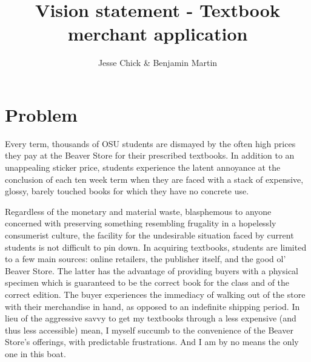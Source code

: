 \documentclass[12pt]{article}
\title{Vision statement - Textbook merchant application}
\author{Jesse Chick \& Benjamin Martin}
\begin{document}
\maketitle
\tableofcontents



\section{Problem}
\par Every term, thousands of OSU students are dismayed by the often high prices they pay at the Beaver Store for their prescribed textbooks. In addition to an unappealing sticker price, students experience the latent annoyance at the conclusion of each ten week term when they are faced with a stack of expensive, glossy, barely touched books for which they have no concrete use. 
\par Regardless of the monetary and material waste, blasphemous to anyone concerned with preserving something resembling frugality in a hopelessly consumerist culture, the facility for the undesirable situation faced by current students is not difficult to pin down. In acquiring textbooks, students are limited to a few main sources: online retailers, the publisher itself, and the good ol’ Beaver Store. The latter has the advantage of providing buyers with a physical specimen which is guaranteed to be the correct book for the class and of the correct edition. The buyer experiences the immediacy of walking out of the store with their merchandise in hand, as opposed to an indefinite shipping period. In lieu of the aggressive savvy to get my textbooks through a less expensive (and thus less accessible) mean, I myself succumb to the convenience of the Beaver Store’s offerings, with predictable frustrations. And I am by no means the only one in this boat.
\end{document}
